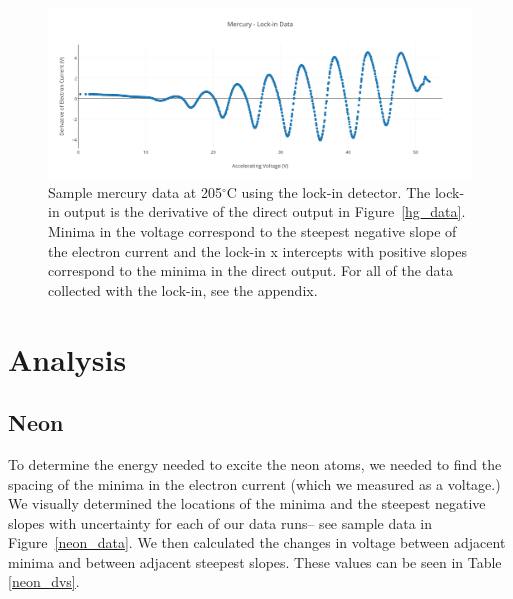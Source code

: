 \documentclass[prb,preprint]{revtex4-1}
\begin{document}
\begin{figure}[h!]
\centering

\includegraphics[width=6in]{hg_lockin.pdf}
\caption{Sample mercury data at 205$^{\circ}$C using the lock-in detector. The lock-in output is the derivative of the direct output in Figure~\ref{hg_data}. Minima in the voltage correspond to the steepest negative slope of the electron current and the lock-in x intercepts with positive slopes correspond to the minima in the direct output. For all of the data collected with the lock-in, see the appendix.}
\label{hg_lockin}
\end{figure}

\section{Analysis}

\subsection{Neon}

To determine the energy needed to excite the neon atoms, we needed to find the spacing of the minima in the electron current (which we measured as a voltage.) We visually determined the locations of the minima and the steepest negative slopes with uncertainty for each of our data runs-- see sample data in Figure~\ref{neon_data}. We then calculated the changes in voltage between adjacent minima and between adjacent steepest slopes. These values can be seen in Table \ref{neon_dvs}.
\end{document}
